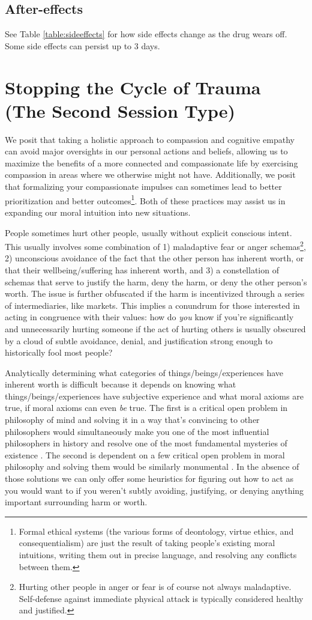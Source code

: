 \documentclass[12pt,letterpaper]{book}
\begin{document}
\subsection*{After-effects}
See Table \ref{table:sideeffects} for how side effects change as the drug wears off. Some side effects can persist up to 3 days.
\section{Stopping the Cycle of Trauma (The Second Session Type)}
\label{stopcycle}
We posit that taking a holistic approach to compassion and cognitive empathy can avoid major oversights in our personal actions and beliefs, allowing us to maximize the benefits of a more connected and compassionate life by exercising compassion in areas where we otherwise might not have. Additionally, we posit that formalizing your compassionate impulses can sometimes lead to better prioritization and better outcomes\footnote{Formal ethical systems (the various forms of deontology, virtue ethics, and consequentialism) are just the result of taking people's existing moral intuitions, writing them out in precise language, and resolving any conflicts between them.}. Both of these practices may assist us in expanding our moral intuition into new situations.

People sometimes hurt other people, usually without explicit conscious intent. This usually involves some combination of 1) maladaptive fear or anger schemas\footnote{Hurting other people in anger or fear is of course not always maladaptive. Self-defense against immediate physical attack is typically considered healthy and justified.}, 2) unconscious avoidance of the fact that the other person has inherent worth, or that their wellbeing/suffering has inherent worth, and 3) a constellation of schemas that serve to justify the harm, deny the harm, or deny the other person's worth. The issue is further obfuscated if the harm is incentivized through a series of intermediaries, like markets. This implies a conundrum for those interested in acting in congruence with their values: how do \textit{you} know if you're significantly and unnecessarily hurting someone if the act of hurting others is usually obscured by a cloud of subtle avoidance, denial, and justification strong enough to historically fool most people?

Analytically determining what categories of things/beings/experiences have inherent worth is difficult because it depends on knowing what things/beings/experiences have subjective experience and what moral axioms are true, if moral axioms can even \textit{be} true. The first is a critical open problem in philosophy of mind and solving it in a way that's convincing to other philosophers would simultaneously make you one of the most influential philosophers in history and resolve one of the most fundamental mysteries of existence \cite{hardProblem}. The second is dependent on a few critical open problem in moral philosophy and solving them would be similarly monumental \cite{metaEthics}. In the absence of those solutions we can only offer some heuristics for figuring out how to act as you would want to if you weren't subtly avoiding, justifying, or denying anything important surrounding harm or worth.
\end{document}
